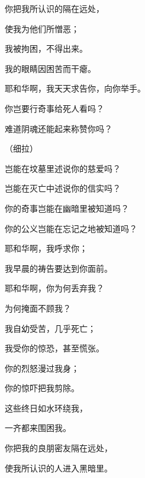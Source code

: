 {\BB \par }{\Q {}你把我所认识的隔在远处，
\par }{\Q 使我为他们所憎恶；
\par }{\Q 我被拘困，不得出来。
\par }{\Q {}我的眼睛因困苦而干瘪。
\par }{\Q 耶和华啊，我天天求告你，向你举手。
\par }{\Q {}你岂要行奇事给死人看吗？
\par }{\Q 难道阴魂还能起来称赞你吗？
\par }{\QS （细拉）
\par }
{\Q {}岂能在坟墓里述说你的慈爱吗？
\par }{\Q 岂能在灭亡中述说你的信实吗？
\par }{\Q {}你的奇事岂能在幽暗里被知道吗？
\par }{\Q 你的公义岂能在忘记之地被知道吗？
\par }{\BB \par }{\Q {}耶和华啊，我呼求你；
\par }{\Q 我早晨的祷告要达到你面前。
\par }{\Q {}耶和华啊，你为何丢弃我？
\par }{\Q 为何掩面不顾我？
\par }{\Q {}我自幼受苦，几乎死亡；
\par }{\Q 我受你的惊恐，甚至慌张。
\par }{\Q {}你的烈怒漫过我身；
\par }{\Q 你的惊吓把我剪除。
\par }{\Q {}这些终日如水环绕我，
\par }{\Q 一齐都来围困我。
\par }{\Q {}你把我的良朋密友隔在远处，
\par }{\Q 使我所认识的人进入黑暗里。

\par }
